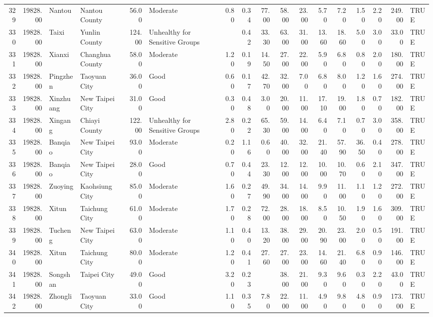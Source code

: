 \begin{table}[ht]
\begin{tabular}{rrllrlrrrrrrrrrrl}
  329 & 19828.00 & Nantou & Nantou County & 56.00 & Moderate & 0.80 & 0.34 & 77.00 & 58.00 & 23.00 & 5.70 & 7.20 & 1.50 & 2.20 & 249.00 & TRUE \\ 
  330 & 19828.00 & Taixi & Yunlin County & 124.00 & Unhealthy for Sensitive Groups &  & 0.42 & 33.30 & 63.00 & 31.00 & 13.60 & 18.60 & 5.00 & 3.00 & 33.00 & TRUE \\ 
  331 & 19828.00 & Xianxi & Changhua County & 58.00 & Moderate & 1.20 & 0.19 & 14.50 & 27.00 & 22.00 & 5.90 & 6.80 & 0.80 & 2.00 & 180.00 & TRUE \\ 
  332 & 19828.00 & Pingzhen & Taoyuan City & 36.00 & Good & 0.60 & 0.17 & 42.70 & 32.00 & 7.00 & 6.80 & 8.00 & 1.20 & 1.60 & 274.00 & TRUE \\ 
  333 & 19828.00 & Xinzhuang & New Taipei City & 31.00 & Good & 0.30 & 0.48 & 3.00 & 20.00 & 11.00 & 17.10 & 19.00 & 1.80 & 0.70 & 182.00 & TRUE \\ 
  334 & 19828.00 & Xingang & Chiayi County & 122.00 & Unhealthy for Sensitive Groups & 2.80 & 0.22 & 65.30 & 59.00 & 14.00 & 6.40 & 7.10 & 0.70 & 3.00 & 358.00 & TRUE \\ 
  335 & 19828.00 & Banqiao & New Taipei City & 93.00 & Moderate & 0.20 & 1.16 & 0.60 & 40.00 & 32.00 & 21.40 & 57.90 & 36.50 & 0.40 & 278.00 & TRUE \\ 
  336 & 19828.00 & Banqiao & New Taipei City & 28.00 & Good & 0.70 & 0.44 & 23.30 & 12.00 & 12.00 & 10.00 & 10.70 & 0.60 & 2.10 & 347.00 & TRUE \\ 
  337 & 19828.00 & Zuoying & Kaohsiung City & 85.00 & Moderate & 1.60 & 0.27 & 49.90 & 34.00 & 14.00 & 9.90 & 11.00 & 1.10 & 1.20 & 272.00 & TRUE \\ 
  338 & 19828.00 & Xitun & Taichung City & 61.00 & Moderate & 1.70 & 0.28 & 72.00 & 28.00 & 18.00 & 8.50 & 10.50 & 1.90 & 1.60 & 309.00 & TRUE \\ 
  339 & 19828.00 & Tucheng & New Taipei City & 63.00 & Moderate & 1.10 & 0.40 & 13.20 & 38.00 & 29.00 & 20.90 & 23.00 & 2.00 & 0.50 & 191.00 & TRUE \\ 
  340 & 19828.00 & Xitun & Taichung City & 80.00 & Moderate & 1.20 & 0.41 & 27.60 & 27.00 & 23.00 & 14.60 & 21.40 & 6.80 & 0.90 & 146.00 & TRUE \\ 
  341 & 19828.00 & Songshan & Taipei City & 49.00 & Good & 3.20 & 0.23 &  & 38.00 & 21.00 & 9.30 & 9.60 & 0.30 & 2.20 & 43.00 & TRUE \\ 
  342 & 19828.00 & Zhongli & Taoyuan City & 33.00 & Good & 1.10 & 0.35 & 7.80 & 22.00 & 11.00 & 4.90 & 9.80 & 4.80 & 0.90 & 173.00 & TRUE \\ 

\end{tabular}
\end{table}
